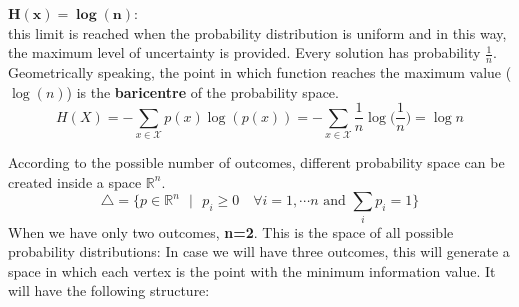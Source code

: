 $\mathbf{H(x) = \log(n)}$:\\
this limit is reached when the probability distribution is uniform and in this way, the maximum level of uncertainty is provided. Every solution has probability $\frac{1}{n}$. Geometrically speaking, the point in which function reaches the maximum value ($\log(n)$) is the \textbf{baricentre} of the probability space.\\
$$H(X) =  - \sum_{x \in \mathcal{X}}p(x)\log(p(x)) =  - \sum_{x \in \mathcal{X}}\frac{1}{n}\log\Big(\frac{1}{n}\Big) = \log n$$

According to the possible number of outcomes, different probability space can be created inside a space $\mathbb{R}^n$.
$$\bigtriangleup = \{p \in \mathbb{R}^n \text{  } |\text{  } p_i \geq 0 \quad	\forall i = 1, \cdots n \text{ and } \sum_i p_i = 1\}$$
When we have only two outcomes, \textbf{n=2}. This is the space of all possible probability distributions:
In case we will have three outcomes, this will generate a space in which each vertex is the point with the minimum information value. It will have the following structure:



